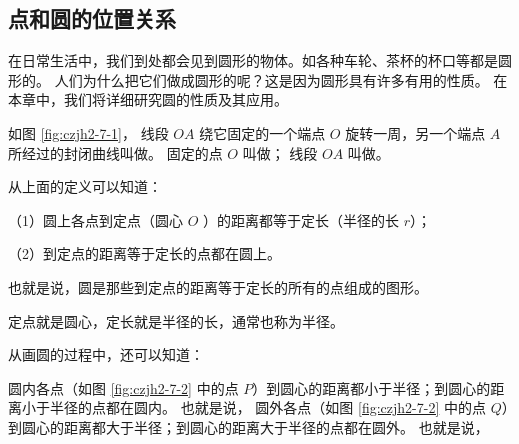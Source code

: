 \subsection{点和圆的位置关系}\label{subsec:czjh2-7-1}

在日常生活中，我们到处都会见到圆形的物体。如各种车轮、茶杯的杯口等都是圆形的。
人们为什么把它们做成圆形的呢？这是因为圆形具有许多有用的性质。
在本章中，我们将详细研究圆的性质及其应用。

如图 \ref{fig:czjh2-7-1}， 线段 $OA$ 绕它固定的一个端点 $O$ 旋转一周，另一个端点 $A$ 所经过的封闭曲线叫做。
固定的点 $O$ 叫做； 线段 $OA$ 叫做。

\begin{figure}[htbp]
    \centering
    \begin{minipage}[b]{4cm}
        \centering
        
        \caption{}\label{fig:czjh2-7-1}
    \end{minipage}
    \qquad
    \begin{minipage}[b]{5cm}
        \centering
        
        \caption{}\label{fig:czjh2-7-2}
    \end{minipage}
    \qquad
    \begin{minipage}[b]{4.5cm}
        \centering
        
        \caption{}\label{fig:czjh2-7-3}
    \end{minipage}
\end{figure}

从上面的定义可以知道：

（1）圆上各点到定点（圆心 $O$ ）的距离都等于定长（半径的长 $r$）；

（2）到定点的距离等于定长的点都在圆上。

也就是说，圆是那些到定点的距离等于定长的所有的点组成的图形。

定点就是圆心，定长就是半径的长，通常也称为半径。

从画圆的过程中，还可以知道：

圆内各点（如图 \ref{fig:czjh2-7-2} 中的点 $P$）到圆心的距离都小于半径；到圆心的距离小于半径的点都在圆内。
也就是说，
圆外各点（如图 \ref{fig:czjh2-7-2} 中的点 $Q$）到圆心的距离都大于半径；到圆心的距离大于半径的点都在圆外。
也就是说，

%         
%         


